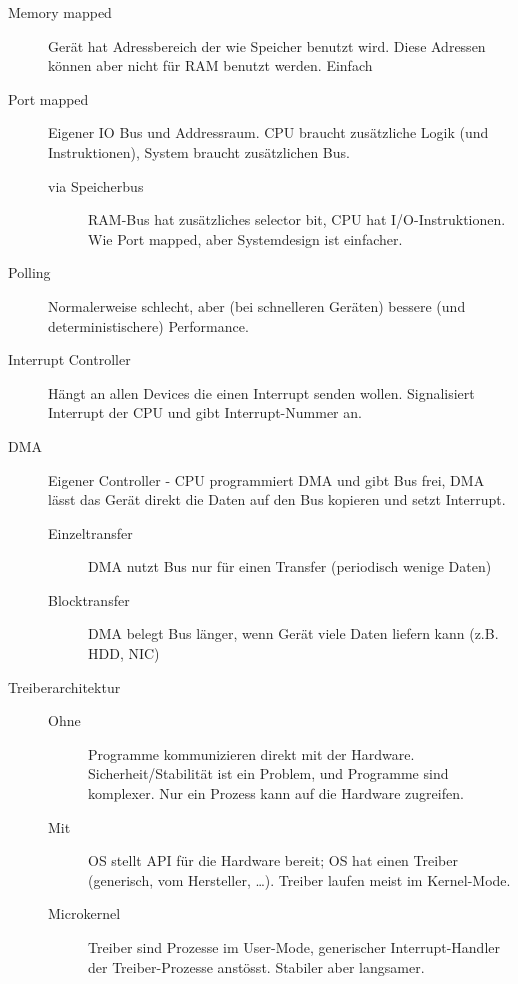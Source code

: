 \documentclass[10pt,landscape,a4paper]{article}
\begin{document}
\begin{multicols*}{3}
\begin{description}
\item[Memory mapped] Gerät hat Adressbereich der wie Speicher benutzt wird.
  Diese Adressen können aber nicht für RAM benutzt werden. Einfach
\item[Port mapped] Eigener IO Bus und Addressraum. CPU braucht zusätzliche Logik
  (und Instruktionen), System braucht zusätzlichen Bus.
  \begin{description}
    \item[via Speicherbus] RAM-Bus hat zusätzliches selector bit, CPU
      hat I/O-Instruktionen. Wie Port mapped, aber Systemdesign ist einfacher.
  \end{description}
\item[Polling] Normalerweise schlecht, aber (bei schnelleren Geräten) bessere
  (und deterministischere) Performance.
\item[Interrupt Controller] Hängt an allen Devices die einen Interrupt senden
  wollen. Signalisiert Interrupt der CPU und gibt Interrupt-Nummer an.
\item[DMA] Eigener Controller - CPU programmiert DMA und gibt Bus frei, DMA
  lässt das Gerät direkt die Daten auf den Bus kopieren und setzt Interrupt.
  \begin{description}
  \item[Einzeltransfer] DMA nutzt Bus nur für einen Transfer (periodisch wenige
    Daten)
  \item[Blocktransfer] DMA belegt Bus länger, wenn Gerät viele Daten liefern
    kann (z.B. HDD, NIC)
  \end{description}
\item[Treiberarchitektur] \strut
  \begin{description}
    \item[Ohne] Programme kommunizieren direkt mit der Hardware.
      Sicherheit/Stabilität ist ein Problem, und Programme sind komplexer.
      Nur ein Prozess kann auf die Hardware zugreifen.
    \item[Mit] OS stellt API für die Hardware bereit; OS hat einen Treiber
      (generisch, vom Hersteller, …). Treiber laufen meist im Kernel-Mode.
    \item[Microkernel] Treiber sind Prozesse im User-Mode, generischer
      Interrupt-Handler der Treiber-Prozesse anstösst. Stabiler aber langsamer.
  \end{description}
\end{description}

\pagebreak


\end{multicols*}
\end{document}
